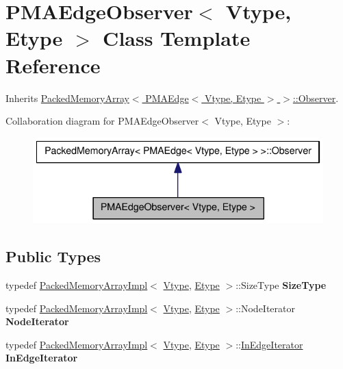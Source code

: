 \hypertarget{class_p_m_a_edge_observer}{
\section{PMAEdgeObserver$<$ Vtype, Etype $>$ Class Template Reference}
\label{class_p_m_a_edge_observer}
}


Inherits \hyperlink{class_packed_memory_array_1_1_observer}{PackedMemoryArray$<$ PMAEdge$<$ Vtype, Etype $>$ $>$::Observer}.



Collaboration diagram for PMAEdgeObserver$<$ Vtype, Etype $>$:\nopagebreak
\begin{figure}[H]
\begin{center}
\leavevmode
\includegraphics[width=334pt]{class_p_m_a_edge_observer__coll__graph}
\end{center}
\end{figure}
\subsection*{Public Types}
\begin{DoxyCompactItemize}
\item 
\hypertarget{class_p_m_a_edge_observer_af43dc13e4e50a7e043829fe519cc0ac3}{
typedef \hyperlink{class_packed_memory_array_impl}{PackedMemoryArrayImpl}$<$ \hyperlink{class_vtype}{Vtype}, \hyperlink{class_etype}{Etype} $>$::SizeType {\bfseries SizeType}}
\label{class_p_m_a_edge_observer_af43dc13e4e50a7e043829fe519cc0ac3}

\item 
\hypertarget{class_p_m_a_edge_observer_a1f073bf4280f4197ffc437abf8d13254}{
typedef \hyperlink{class_packed_memory_array_impl}{PackedMemoryArrayImpl}$<$ \hyperlink{class_vtype}{Vtype}, \hyperlink{class_etype}{Etype} $>$::NodeIterator {\bfseries NodeIterator}}
\label{class_p_m_a_edge_observer_a1f073bf4280f4197ffc437abf8d13254}

\item 
\hypertarget{class_p_m_a_edge_observer_a3b69a25e9fd3990ff45219fc7084c896}{
typedef \hyperlink{class_packed_memory_array_impl}{PackedMemoryArrayImpl}$<$ \hyperlink{class_vtype}{Vtype}, \hyperlink{class_etype}{Etype} $>$::\hyperlink{class_packed_memory_array_1_1_iterator}{InEdgeIterator} {\bfseries InEdgeIterator}}
\label{class_p_m_a_edge_observer_a3b69a25e9fd3990ff45219fc7084c896}

\end{DoxyCompactItemize}
